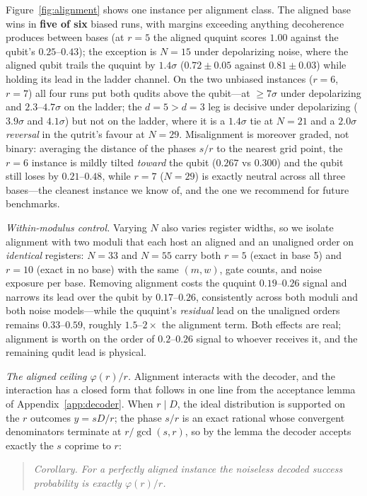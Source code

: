 \documentclass[aps,pra,reprint,superscriptaddress,nofootinbib,floatfix]{revtex4-2}
\begin{document}
Figure~\ref{fig:alignment} shows one instance per alignment class. The
aligned base wins in \textbf{five of six} biased runs, with margins
exceeding anything decoherence produces between bases (at $r=5$ the
aligned ququint scores $1.00$ against the qubit's $0.25$--$0.43$); the
exception is $N=15$ under depolarizing noise, where the aligned qubit
trails the ququint by $1.4\sigma$ ($0.72\pm0.05$ against
$0.81\pm0.03$) while holding its lead in the ladder channel. On
the two unbiased instances ($r=6$, $r=7$) all four runs put both
qudits above the qubit---at ${\ge}7\sigma$ under depolarizing and
$2.3$--$4.7\sigma$ on the ladder; the $d=5>d=3$ leg is
decisive under depolarizing ($3.9\sigma$ and $4.1\sigma$) but not
on the ladder, where it is a $1.4\sigma$ tie at $N=21$ and a
$2.0\sigma$ \emph{reversal} in the qutrit's favour at $N=29$. Misalignment is moreover graded, not binary:
averaging the distance of the phases $s/r$ to the nearest grid point,
the $r=6$ instance is mildly tilted \emph{toward} the qubit ($0.267$ vs
$0.300$) and the qubit still loses by $0.21$--$0.48$, while $r=7$
($N=29$) is exactly neutral across all three bases---the cleanest
instance we know of, and the one we recommend for future benchmarks.

\emph{Within-modulus control.} Varying $N$ also varies register widths,
so we isolate alignment with two moduli that each host an aligned and an
unaligned order on \emph{identical} registers: $N=33$ and $N=55$ carry
both $r=5$ (exact in base 5) and $r=10$ (exact in no base) with the same
$(m,w)$, gate counts, and noise exposure per base. Removing alignment
costs the ququint $0.19$--$0.26$ signal and narrows its lead over the
qubit by $0.17$--$0.26$, consistently across both moduli and both noise
models---while the ququint's \emph{residual} lead on the unaligned
orders remains $0.33$--$0.59$, roughly $1.5$--$2\times$ the
alignment term. Both effects
are real; alignment is worth on the order of $0.2$--$0.26$ signal to whoever receives
it, and the remaining qudit lead is physical.

\emph{The aligned ceiling $\varphi(r)/r$.} Alignment interacts with
the decoder, and the interaction has a closed form that follows in one
line from the acceptance lemma of Appendix~\ref{app:decoder}. When
$r\mid D$, the ideal distribution is supported on the $r$ outcomes
$y=sD/r$; the phase $s/r$ is an exact rational whose convergent
denominators terminate at $r/\gcd(s,r)$, so by the lemma the decoder
accepts exactly the $s$ coprime to $r$:

\begin{quote}
\emph{Corollary. For a perfectly aligned instance the noiseless
decoded success probability is exactly $\varphi(r)/r$.}
\end{quote}
\end{document}
